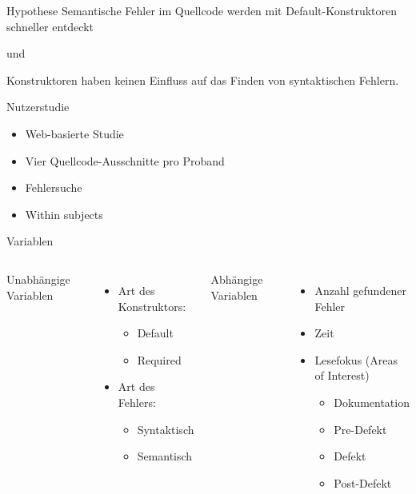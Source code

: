 \documentclass[10pt]{beamer}
\begin{document}
	\begin{frame}[standout]{Hypothese}
		Semantische Fehler im Quellcode werden mit Default-Konstruktoren schneller entdeckt
		\begin{center}\small{und}\end{center}
		Konstruktoren haben keinen Einfluss auf das Finden von syntaktischen Fehlern.
	\end{frame}

	\begin{frame}{Nutzerstudie}
		\begin{itemize}
			\item Web-basierte Studie\\
			\vspace{\baselineskip}
			\item Vier Quellcode-Ausschnitte pro Proband\\
			\vspace{\baselineskip}
			\item Fehlersuche\\
			\vspace{\baselineskip}
			\item Within subjects
		\end{itemize}
	\end{frame}

	\begin{frame}{Variablen}
		\begin{columns}[T,onlytextwidth]
	
			Unabhängige Variablen
			\begin{itemize}
				\item Art des Konstruktors:
				\begin{itemize}
					\item Default
					\item Required
				\end{itemize}
				\item Art des Fehlers:
				\begin{itemize}
					\item Syntaktisch
					\item Semantisch
				\end{itemize}
			\end{itemize}			
		
			Abhängige Variablen
			\begin{itemize}
				\item Anzahl gefundener Fehler
				\item Zeit
				\item Lesefokus (Areas of Interest)
				\begin{itemize}
					\item Dokumentation
					\item Pre-Defekt
					\item Defekt
					\item Post-Defekt
				\end{itemize}
			\end{itemize}
			
		\end{columns}	
	\end{frame}
\end{document}

